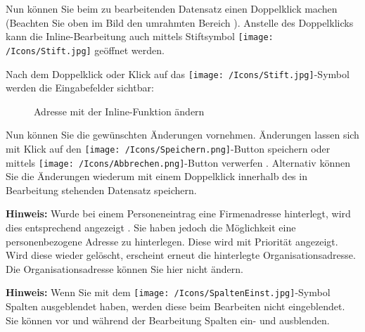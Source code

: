 Nun können Sie beim zu bearbeitenden Datensatz einen Doppelklick machen (Beachten Sie oben im Bild den umrahmten Bereich ). Anstelle des Doppelklicks kann die Inline-Bearbeitung auch mittels Stiftsymbol \texttt{[image: /Icons/Stift.jpg]}  geöffnet werden.

\vspace{\baselineskip}

Nach dem Doppelklick oder Klick auf das \texttt{[image: /Icons/Stift.jpg]}-Symbol  werden die Eingabefelder sichtbar:

\begin{figure}[H]
\caption{Adresse mit der Inline-Funktion ändern}
\end{figure}

Nun können Sie die gewünschten Änderungen vornehmen. Änderungen lassen sich mit Klick auf den \texttt{[image: /Icons/Speichern.png]}-Button speichern oder mittels \texttt{[image: /Icons/Abbrechen.png]}-Button verwerfen . Alternativ können Sie die Änderungen wiederum mit einem Doppelklick innerhalb des in Bearbeitung stehenden Datensatz speichern.

\vspace{\baselineskip}

\textbf{Hinweis:} Wurde bei einem Personeneintrag eine Firmenadresse hinterlegt, wird dies entsprechend angezeigt . Sie haben jedoch die Möglichkeit eine personenbezogene Adresse zu hinterlegen. Diese wird mit Priorität angezeigt. Wird diese wieder gelöscht, erscheint erneut die hinterlegte Organisationsadresse. Die Organisationsadresse können Sie hier nicht ändern.

\vspace{\baselineskip}

\textbf{Hinweis:} Wenn Sie mit dem \texttt{[image: /Icons/SpaltenEinst.jpg]}-Symbol  Spalten ausgeblendet haben, werden diese beim Bearbeiten nicht eingeblendet. Sie können vor und während der Bearbeitung Spalten ein- und ausblenden.

